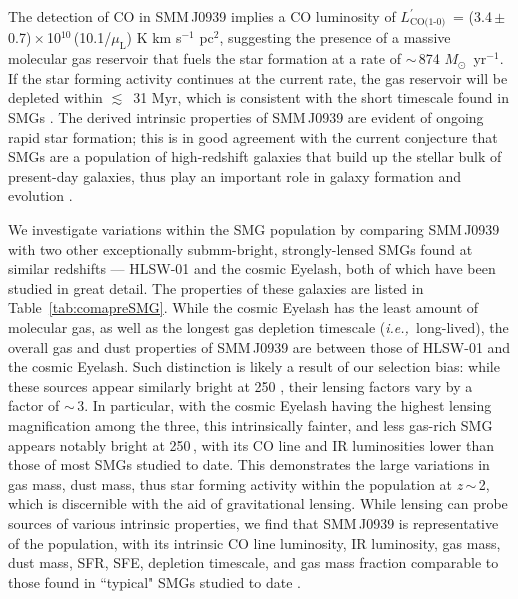\documentclass[twocolumn,apj,numberedappendix]{emulateapj}
\newcommand{\Msun}{\mbox{$M_{\odot}$}}
\newcommand{\Lp}{\mbox{$L^{\prime}_\textrm{CO(1-0)}$}}
\newcommand{\LpU}{\mbox{K\,\,km\,\,s$^{-1}$\,\,pc$^2$}}
\newcommand{\eg}{{\sl e.g.,~}}
\newcommand{\ie}{{\sl i.e.,~}}
\newcommand{\pmOne}{\mbox{$^{-1}$}}
\begin{document}
The detection of CO in SMM\,J0939
implies a CO luminosity of \Lp\ = (3.4\,$\pm$\,0.7)\,$\times$\,10$^{10}$\,(10.1/$\mu_\textrm{L}$) \LpU, suggesting the presence of a massive
molecular gas reservoir that fuels the star formation at a rate of $\sim$\,874 \Msun~yr\pmOne. If the star forming activity continues at the current rate, the gas reservoir will be depleted within $\lesssim$~31 Myr,
which is consistent with the short timescale found in SMGs \citep{Greve05a}. The derived intrinsic properties of SMM\,J0939 are evident of ongoing rapid star formation; this is in good agreement with the current conjecture that SMGs are a %
population of high-redshift galaxies that build up the stellar bulk of present-day galaxies, thus play an important role
in galaxy formation and evolution \citep[\eg ][]{Dickinson03a}.

We investigate variations within the SMG population by comparing SMM\,J0939 with two other exceptionally submm-bright,
strongly-lensed SMGs
found at similar redshifts --- HLSW-01 and the cosmic Eyelash, both of which have been studied in great detail. The properties
of these galaxies are listed in Table~\ref{tab:comapreSMG}. While the cosmic Eyelash has the least amount of molecular gas, as well as
the
longest gas depletion timescale (\ie long-lived), the overall gas and dust properties of SMM\,J0939 are between those of HLSW-01 and the
cosmic
Eyelash. Such distinction is likely a result of our selection bias: while these sources appear similarly bright at 250 \micron, their lensing factors
vary by a factor of $\sim$\,3. In particular, with the cosmic Eyelash having the highest lensing magnification among the
three, this
intrinsically fainter, and less gas-rich SMG appears notably bright
at 250\,\micron, with its CO line and IR luminosities lower than those of most SMGs studied to date.
This demonstrates
the large variations in gas mass, dust mass, thus star forming activity within the population at $z$\,$\sim$\,2, which is discernible with the aid of gravitational lensing.
While lensing can probe sources
of various intrinsic properties, we find that SMM\,J0939 is representative of the population, with its intrinsic CO line luminosity, IR luminosity, gas mass,
dust mass, SFR, SFE, depletion timescale, and gas mass fraction comparable to those found in ``typical" SMGs studied to date
\citep[\eg ][]{Greve05a,Tacconi10a}.
\end{document}
